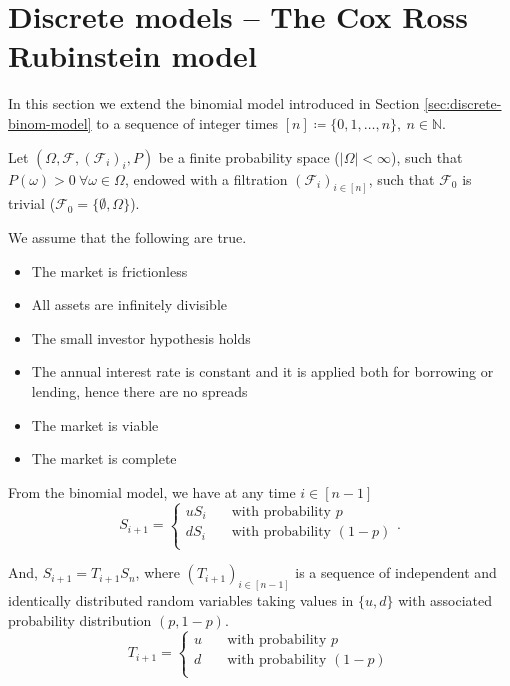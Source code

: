 \section{Discrete models -- The Cox Ross Rubinstein model}
\label{sec:discrete-cox-ross-rubinstein}

In this section we extend the binomial model introduced in Section \ref{sec:discrete-binom-model} to a sequence of integer times $ [n] \coloneqq \{ 0, 1, \dots, n \}, \  n \in \mathbb{N} $.

Let $ (\Omega, \mathcal{F}, (\mathcal{F}_i)_i, P) $ be a finite probability space ($ |\Omega| < \infty $), such that $ P(\omega) > 0 \  \forall \omega \in \Omega $, endowed with a filtration $ (\mathcal{F}_i)_{i \in [n]} $, such that $ \mathcal{F}_0 $ is trivial ($ \mathcal{F}_0 = \{ \emptyset, \Omega \} $).

We assume that the following are true.
\begin{itemize}
	\item The market is frictionless
	\item All assets are infinitely divisible
	\item The small investor hypothesis holds
	\item The annual interest rate is constant and it is applied both for borrowing or lending, hence there are no spreads
	\item The market is viable
	\item The market is complete
\end{itemize}


From the binomial model, we have at any time $ i \in [n-1] $
\begin{equation*}
	S_{i + 1} =
	\begin{cases}
		u S_i & \quad \text{with probability } p \\
		d S_i & \quad \text{with probability } (1 - p) \\		
	\end{cases}.
\end{equation*}

And, $ S_{i+1} = T_{i+1} S_n $, where $ (T_{i+1})_{i \in [n-1]} $ is a sequence of independent and identically distributed random variables taking values in $ \{ u, d \} $ with associated probability distribution $ (p, 1-p) $.
\begin{equation*}
	T_{i+1} =
	\begin{cases}
		u  & \quad \text{with probability } p \\
		d  & \quad \text{with probability } (1 - p) \\		
	\end{cases}
\end{equation*}

